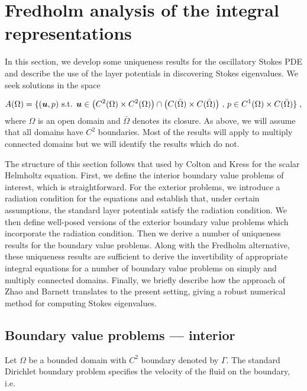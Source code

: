 \section{Fredholm analysis of the integral representations}

In this section, we develop some uniqueness
results for the oscillatory Stokes PDE and describe
the use of the layer potentials in discovering Stokes
eigenvalues.
%
We seek solutions in the space

\begin{equation}
  A(\Omega) = \{ ({\boldsymbol u},p) \textrm{ s.t. } {\boldsymbol u} \in
  \left ( C^2(\Omega)\times C^2(\Omega) \right ) \cap
  \left ( C(\bar{\Omega}) \times C(\bar{\Omega}) \right ) \, , \,
  p \in C^1(\Omega) \times C(\bar{\Omega})\} \; ,
\end{equation}
where $\Omega$ is an open domain and $\bar{\Omega}$ denotes
its closure.
%
As above, we will assume that all domains have $C^2$ boundaries.
%
Most of the results will apply to multiply connected domains
but we will identify the results which do not.
%

The structure of this section follows that used
by Colton and Kress \cite[Ch. 3]{colton1983integral}
for the scalar Helmholtz equation.
%
First, we define the interior boundary value problems
of interest, which is straightforward.
%
For the exterior problems, we introduce a radiation condition
for the equations and establish that, under certain assumptions,
the standard layer potentials satisfy the radiation condition.
%
We then define well-posed versions of the
exterior boundary value problems which incorporate the
radiation condition.
%
Then we derive a number of uniqueness
results for the boundary value problems.
%
Along with the Fredholm alternative, these uniqueness
results are sufficient to derive the invertibility of appropriate
integral equations for a number of boundary value problems
on simply and multiply connected domains.
%
Finally, we briefly describe how the approach of Zhao
and Barnett translates to the present setting, giving
a robust numerical method for computing Stokes
eigenvalues.

\subsection{Boundary value problems --- interior}

Let $\Omega$ be a bounded domain with $C^2$ boundary
denoted by $\Gamma$.
The standard Dirichlet boundary problem specifies the
velocity of the fluid on the boundary, i.e.

